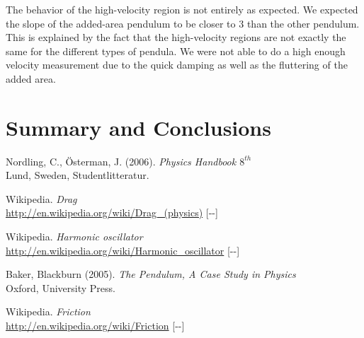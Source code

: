 \documentclass[11pt, a4paper]{article}
\newcommand{\todayswe}{\the\year-\twodigit\month-\twodigit\day}
\begin{document}
The behavior of the high-velocity region is not entirely as expected. We expected the slope of the added-area pendulum 
to be closer to $3$ than the other pendulum.
This is explained by the fact that the high-velocity regions are not exactly the same for the different types of pendula. We were not 
able to do a high enough velocity measurement due to the quick damping as well as the fluttering of the added area.
\section{Summary and Conclusions}
\vfill

\begin{thebibliography}{99}
	 Nordling, C., Österman, J. (2006). 
  \textit{Physics Handbook  $8^{th}$}\\
  Lund, Sweden, Studentlitteratur.

   Wikipedia. \textit{Drag}\\ 
  \url{http://en.wikipedia.org/wiki/Drag_(physics)} [\todayswe]

   Wikipedia. \textit{Harmonic oscillator}\\ 
  \url{http://en.wikipedia.org/wiki/Harmonic_oscillator} [\todayswe]

	 Baker, Blackburn (2005). 
  \textit{The Pendulum, A Case Study in Physics}\\
  Oxford, University Press.

   Wikipedia. \textit{Friction}\\ 
  \url{http://en.wikipedia.org/wiki/Friction} [\todayswe]

\end{thebibliography}

\begin{appendix}
\end{appendix}

\end{document}
